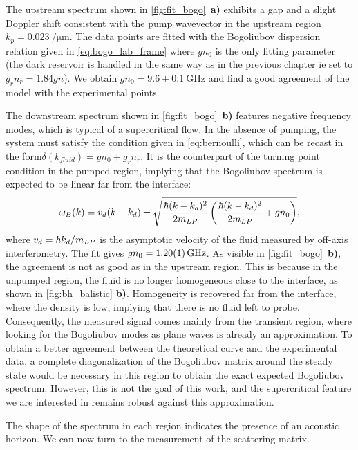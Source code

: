 The upstream spectrum shown in \autoref{fig:fit_bogo}~\textbf{a)} exhibits a gap and a slight Doppler shift consistent with the pump wavevector in the upstream region $k_p=\SI{0.023}{\per \micro \meter}$. The data points are fitted with the Bogoliubov dispersion relation given in \autoref{eq:bogo_lab_frame} where $gn_0$ is the only fitting parameter (the dark reservoir
is handled in the same way as in the previous chapter ie set to $g_rn_r=1.84gn$). 
We obtain $gn_0=9.6\pm\SI{0.1}{\giga \hertz}$ and find a good agreement of the model with the experimental points.

The downstream spectrum shown in \autoref{fig:fit_bogo}~\textbf{b)} features negative frequency modes, which is typical of a supercritical flow.
In the absence of pumping, the system must satisfy the condition given in \autoref{eq:bernoulli}, which can be recast in the form$\delta(k_{fluid})=gn_0+g_rn_r$. It is the counterpart of the turning point condition in the pumped region, implying that the Bogoliubov spectrum is expected to be linear far from the interface:
\begin{equation}
    \omega_B(k) = v_d(k-k_d) \pm \sqrt{\dfrac{\hbar (k-k_d)^2}{2m_{LP}} \left({\dfrac{\hbar (k-k_d)^2}{2m_{LP}}} + g n_0 \right)},
\end{equation}
where $v_d = \hbar k_d/m_{LP}$ is the asymptotic velocity of the fluid measured by off-axis interferometry. The fit gives $gn_0=\SI{1.2 \pm 0.01}{\giga \hertz}$. As visible in \autoref{fig:fit_bogo}~\textbf{b)}, the agreement is not as good as in the upstream region. 
This is because in the unpumped region, the fluid is no longer homogeneous close to the interface, as shown in \autoref{fig:bh_balistic} \textbf{b)}.
Homogeneity is recovered far from the interface, where the density is low, implying that there is no fluid left to probe.
Consequently, the measured signal comes mainly from the transient region, where looking for the Bogoliubov modes as plane waves is already an approximation.
To obtain a better agreement between the theoretical curve and the experimental data, a complete diagonalization of the Bogoliubov matrix around the steady state would be necessary in this region to obtain the exact expected Bogoliubov spectrum. However, this is not the goal of this work, and the supercritical feature we are interested in
remains robust against this approximation.

The shape of the spectrum in each region indicates the presence of an acoustic horizon.
We can now turn to the measurement of the scattering matrix.

